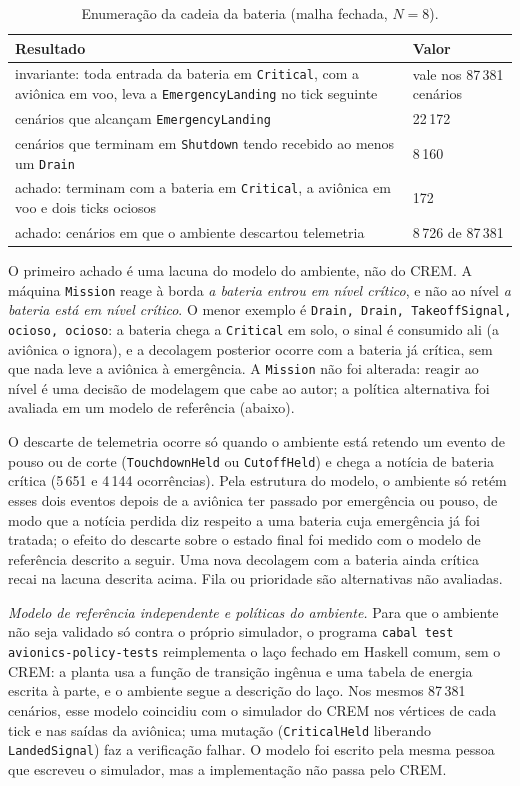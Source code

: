\documentclass[12pt,a4paper]{article}
\begin{document}
\begin{table}[h]
\centering
\footnotesize
\begin{tabular}{|p{10.4cm}|p{3.3cm}|}
\hline
Resultado & Valor \\
\hline
invariante: toda entrada da bateria em \texttt{Critical}, com a aviônica em voo, leva a \texttt{EmergencyLanding} no tick seguinte & vale nos 87\,381 cenários \\
\hline
cenários que alcançam \texttt{EmergencyLanding} & 22\,172 \\
\hline
cenários que terminam em \texttt{Shutdown} tendo recebido ao menos um \texttt{Drain} & 8\,160 \\
\hline
achado: terminam com a bateria em \texttt{Critical}, a aviônica em voo e dois ticks ociosos & 172 \\
\hline
achado: cenários em que o ambiente descartou telemetria & 8\,726 de 87\,381 \\
\hline
\end{tabular}
\caption{Enumeração da cadeia da bateria (malha fechada, $N = 8$).}
\end{table}

O primeiro achado é uma lacuna do modelo do ambiente, não do CREM. A máquina \texttt{Mission} reage à borda \textit{a bateria entrou em nível crítico}, e não ao nível \textit{a bateria está em nível crítico}. O menor exemplo é \texttt{Drain, Drain, TakeoffSignal, ocioso, ocioso}: a bateria chega a \texttt{Critical} em solo, o sinal é consumido ali (a aviônica o ignora), e a decolagem posterior ocorre com a bateria já crítica, sem que nada leve a aviônica à emergência. A \texttt{Mission} não foi alterada: reagir ao nível é uma decisão de modelagem que cabe ao autor; a política alternativa foi avaliada em um modelo de referência (abaixo).

O descarte de telemetria ocorre só quando o ambiente está retendo um evento de pouso ou de corte (\texttt{TouchdownHeld} ou \texttt{CutoffHeld}) e chega a notícia de bateria crítica (5\,651 e 4\,144 ocorrências). Pela estrutura do modelo, o ambiente só retém esses dois eventos depois de a aviônica ter passado por emergência ou pouso, de modo que a notícia perdida diz respeito a uma bateria cuja emergência já foi tratada; o efeito do descarte sobre o estado final foi medido com o modelo de referência descrito a seguir. Uma nova decolagem com a bateria ainda crítica recai na lacuna descrita acima. Fila ou prioridade são alternativas não avaliadas.

\textit{Modelo de referência independente e políticas do ambiente.} Para que o ambiente não seja validado só contra o próprio simulador, o programa \texttt{cabal test avionics-policy-tests} reimplementa o laço fechado em Haskell comum, sem o CREM: a planta usa a função de transição ingênua e uma tabela de energia escrita à parte, e o ambiente segue a descrição do laço. Nos mesmos 87\,381 cenários, esse modelo coincidiu com o simulador do CREM nos vértices de cada tick e nas saídas da aviônica; uma mutação (\texttt{CriticalHeld} liberando \texttt{LandedSignal}) faz a verificação falhar. O modelo foi escrito pela mesma pessoa que escreveu o simulador, mas a implementação não passa pelo CREM.
\end{document}
